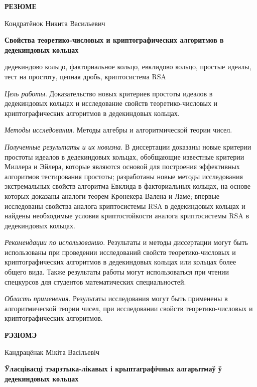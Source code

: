\documentclass[_00_autoref.tex]{subfiles}
\begin{document}
\newpage
\centerline{\textbf{РЕЗЮМЕ}}

\vspace{-0.3ex}
\begin{center}
Кондратёнок Никита Васильевич

\textbf{Свойства теоретико-числовых и криптографических алгоритмов в дедекиндовых кольцах}
\end{center}
\vspace{-0.3ex}

\noindent
дедекиндово кольцо, факториальное кольцо, евклидово кольцо, простые идеалы, тест на простоту, цепная дробь, криптосистема RSA

\textit{Цель работы}.
Доказательство новых критериев простоты идеалов в дедекиндовых кольцах и исследование свойств теоретико-числовых и криптографических алгоритмов в дедекиндовых кольцах.

\textit{Методы исследования}.
Методы алгебры и алгоритмической теории чисел.

\textit{Полученные результаты и их новизна}.
В диссертации доказаны новые критерии простоты идеалов в дедекиндовых кольцах, обобщающие известные критерии Миллера и Эйлера, которые являются основой для построения эффективных алгоритмов тестирования простоты; разработаны новые методы исследования экстремальных свойств алгоритма Евклида в факториальных кольцах, на основе которых доказаны аналоги теорем Кронекера-Валена и Ламе; впервые исследованы свойства аналога криптосистемы RSA в дедекиндовых кольцах и найдены необходимые условия криптостойкости аналога криптосистемы RSA в дедекиндовых кольцах.

\textit{Рекомендации по использованию}.
Результаты и методы диссертации могут быть использованы при проведении исследований свойств теоретико-числовых и криптографических алгоритмов в дедекиндовых кольцах или кольцах более общего вида.
Также результаты работы могут использоваться при чтении спецкурсов для студентов математических специальностей.

\textit{Область применения}.
Результаты исследования могут быть применены в алгоритмической теории чисел, при исследовании свойств теоретико-числовых и криптографических алгоритмов.

\newpage
\centerline{\textbf{РЭЗЮМЭ}}

\vspace{-0.3ex}
\begin{center}
Кандрацёнак Мікіта Васільевіч

\textbf{Ўласцівасці тэарэтыка-лікавых і крыптаграфічных алгарытмаў ў дедекиндовых кольцах}
\end{center}
\vspace{-0.3ex}
\end{document}
